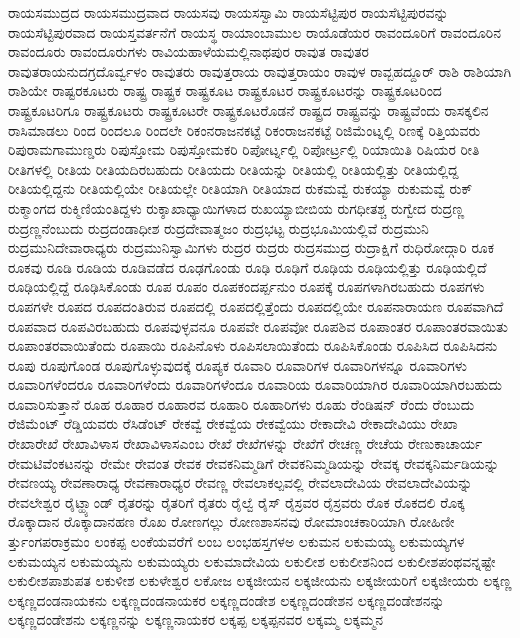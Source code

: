 {ರಾಯಸಮುದ್ರದ
ರಾಯಸಮುದ್ರವಾದ
ರಾಯಸವು
ರಾಯಸಸ್ವಾಮಿ
ರಾಯಸೆಟ್ಟಿಪುರ
ರಾಯಸೆಟ್ಟಿಪುರವನ್ನು
ರಾಯಸೆಟ್ಟಿಪುರವಾದ
ರಾಯಸ್ತವರ್ತನೆಗೆ
ರಾಯಸ್ಥ
ರಾಯಾಂಬಾಮುಲ
ರಾಯೊಡೆಯರ
ರಾವಂದೂರಿಗೆ
ರಾವಂದೂರಿನ
ರಾವಂದೂರು
ರಾವಂದೂರುಗಳು
ರಾವಿಯಹಾಳೆಯಮಲ್ಲಿನಾಥಪುರ
ರಾವುತ
ರಾವುತರ
ರಾವುತರಾಯನುದಗ್ರದೊರ್ವ್ವಳಂ
ರಾವುತರು
ರಾವುತ್ತರಾಯ
ರಾವುತ್ತರಾಯಂ
ರಾವುಳ
ರಾವ್ಬಹದ್ದೂರ್
ರಾಶಿ
ರಾಶಿಯಾಗಿ
ರಾಶಿಯೇ
ರಾಷ್ಟರಕೂಟರು
ರಾಷ್ಟ್ರ
ರಾಷ್ಟ್ರಕ
ರಾಷ್ಟ್ರಕೂಟ
ರಾಷ್ಟ್ರಕೂಟರ
ರಾಷ್ಟ್ರಕೂಟರನ್ನು
ರಾಷ್ಟ್ರಕೂಟರಿಂದ
ರಾಷ್ಟ್ರಕೂಟರಿಗೂ
ರಾಷ್ಟ್ರಕೂಟರು
ರಾಷ್ಟ್ರಕೂಟರೇ
ರಾಷ್ಟ್ರಕೂಟರೊಡನೆ
ರಾಷ್ಟ್ರದ
ರಾಷ್ಟ್ರವನ್ನು
ರಾಷ್ಟ್ರವೆಂದು
ರಾಸಕ್ಕಲಿನ
ರಾಸಿಮಾಡಲು
ರಿಂದ
ರಿಂದಲೂ
ರಿಂದಲೇ
ರಿಕಂನರಾಜನಕಟ್ಟೆ
ರಿಕಂರಾಜನಕಟ್ಟೆ
ರಿಜಿಮೆಂಟ್ನಲ್ಲಿ
ರಿಣಕ್ಕೆ
ರಿತ್ತಿಯವರು
ರಿಪುರಾಮಗಾಮುಣ್ಡರು
ರಿಪುಸ್ತೋಮ
ರಿಪುಸ್ತೋಮಕರಿ
ರಿಪೋರ್ಟ್ನಲ್ಲಿ
ರಿಪೋರ್ಟ್ರಲ್ಲಿ
ರಿಯಾಯಿತಿ
ರಿಷಿಯರ
ರೀತಿ
ರೀತಿಗಳಲ್ಲಿ
ರೀತಿಯ
ರೀತಿಯದಿರಬಹುದು
ರೀತಿಯದು
ರೀತಿಯನ್ನು
ರೀತಿಯಲ್ಲಿ
ರೀತಿಯಲ್ಲಿತ್ತು
ರೀತಿಯಲ್ಲಿದ್ದ
ರೀತಿಯಲ್ಲಿದ್ದನು
ರೀತಿಯಲ್ಲಿಯೇ
ರೀತಿಯಲ್ಲೇ
ರೀತಿಯಾಗಿ
ರೀತಿಯಾದ
ರುಕಮವ್ವೆ
ರುಕಯ್ಯಾ
ರುಕುಮವ್ವೆ
ರುಕ್
ರುಕ್ಮಾಂಗದ
ರುಕ್ಮಿಣಿಯಂತಿದ್ದಳು
ರುಕ್ಶಾಖಾಧ್ಯಾಯಿಗಳಾದ
ರುಖಯ್ಯಾಬೀಬಿಯ
ರುಗಧೀತಶ್ಚ
ರುಗ್ವೇದ
ರುದ್ರಣ್ಣ
ರುದ್ರಣ್ಣನೆಂಬುದು
ರುದ್ರದಂಡಾಧೀಶ
ರುದ್ರದೇವಾತ್ಮಜಂ
ರುದ್ರಭಟ್ಟ
ರುದ್ರಭೂಮಿಯಲ್ಲಿವೆ
ರುದ್ರಮುನಿ
ರುದ್ರಮುನಿದೇವಾರಾಧ್ಯರು
ರುದ್ರಮುನಿಸ್ವಾಮಿಗಳು
ರುದ್ರರ
ರುದ್ರರು
ರುದ್ರಸಮುದ್ರ
ರುದ್ರಾಕ್ಷಿಗೆ
ರುಧಿರೋದ್ಗಾರಿ
ರೂಕ
ರೂಕವು
ರೂಡಿ
ರೂಡಿಯ
ರೂಡಿವಡೆದ
ರೂಢಗೊಂಡು
ರೂಢಿ
ರೂಢಿಗೆ
ರೂಢಿಯ
ರೂಢಿಯಲ್ಲಿತ್ತು
ರೂಢಿಯಲ್ಲಿದೆ
ರೂಢಿಯಲ್ಲಿದ್ದೆ
ರೂಢಿಸಿಕೊಂಡು
ರೂಪ
ರೂಪಂ
ರೂಪಕಂದರ್ಪ್ಪನುಂ
ರೂಪಕ್ಕೆ
ರೂಪಗಳಾಗಿರಬಹುದು
ರೂಪಗಳು
ರೂಪಗಳೇ
ರೂಪದ
ರೂಪದಂತಿರುವ
ರೂಪದಲ್ಲಿ
ರೂಪದಲ್ಲಿತ್ತೆಂದು
ರೂಪದಲ್ಲಿಯೇ
ರೂಪನಾರಾಯಣ
ರೂಪವಾಗಿದೆ
ರೂಪವಾದ
ರೂಪವಿರಬಹುದು
ರೂಪವುಳ್ಳವನೂ
ರೂಪವೇ
ರೂಪವೋ
ರೂಪಶಿವ
ರೂಪಾಂತರ
ರೂಪಾಂತರವಾಯಿತು
ರೂಪಾಂತರವಾಯಿತೆಂದು
ರೂಪಾಯಿ
ರೂಪಿನೊಳು
ರೂಪಿಸಲಾಯಿತೆಂದು
ರೂಪಿಸಿಕೊಂಡು
ರೂಪಿಸಿದ
ರೂಪಿಸಿದನು
ರೂಪು
ರೂಪುಗೊಂಡ
ರೂಪುಗೊಳ್ಳುವುದಕ್ಕೆ
ರೂಪ್ಯಕ
ರೂವಾರಿ
ರೂವಾರಿಗಳ
ರೂವಾರಿಗಳನ್ನೂ
ರೂವಾರಿಗಳು
ರೂವಾರಿಗಳೆಂದರೂ
ರೂವಾರಿಗಳೆಂದು
ರೂವಾರಿಗಳೆಂದೂ
ರೂವಾರಿಯ
ರೂವಾರಿಯಾಗಿರ
ರೂವಾರಿಯಾಗಿರಬಹುದು
ರೂವಾರಿಸುತ್ತಾನೆ
ರೂಹ
ರೂಹಾರ
ರೂಹಾರವ
ರೂಹಾರಿ
ರೂಹಾರಿಗಳು
ರೂಹು
ರೆಂಡಿಷನ್
ರೆಂದು
ರೆಂಬುದು
ರೆಜಿಮೆಂಟ್
ರೆಡ್ಡಿಯವರು
ರೆಸಿಡೆಂಟ್
ರೇಕವ್ವೆ
ರೇಕವ್ವೆಯ
ರೇಕವ್ವೆಯು
ರೇಕಾದೇವಿ
ರೇಕಾದೇವಿಯು
ರೇಖಾ
ರೇಖಾರೇಖೆ
ರೇಖಾವಿಳಾಸ
ರೇಖಾವಿಳಾಸಎಂಬ
ರೇಖೆ
ರೇಖೆಗಳನ್ನು
ರೇಖೆಗೆ
ರೇಚಣ್ಣ
ರೇಚೆಯ
ರೇಣುಕಾಚಾರ್ಯ
ರೇಮಟಿವೆಂಕಟನನ್ನು
ರೇಮೇ
ರೇವಂತ
ರೇವಕ
ರೇವಕನಿಮ್ಮಡಿಗೆ
ರೇವಕನಿಮ್ಮಡಿಯನ್ನು
ರೇವಕ್ಕ
ರೇವಕ್ಕನಿರ್ಮಡಿಯನ್ನು
ರೇವಣಯ್ಯ
ರೇವಣಾರಾಧ್ಯ
ರೇವಣಾರಾಧ್ಯರ
ರೇವಣ್ಣ
ರೇವಲಾಕಲ್ಪವಲ್ಲಿ
ರೇವಲಾದೇವಿಯ
ರೇವಲಾದೇವಿಯನ್ನು
ರೇವಲೇಶ್ವರ
ರೈಟ್ಹ್ಯಾಂಡ್
ರೈತರನ್ನು
ರೈತರಿಗೆ
ರೈತರು
ರೈಲ್ವೆ
ರೈಸ್
ರೈಸ್ರವರ
ರೈಸ್ರವರು
ರೊಕ
ರೊಕದಲಿ
ರೊಕ್ಕ
ರೊಕ್ಕಾದಾನ
ರೊಕ್ಕಾದಾನಹಣ
ರೊಖ
ರೋಣಗಲ್ಲು
ರೋಣಶಾಸನವು
ರೋಮಾಂಚಕಾರಿಯಾಗಿ
ರೋಹಿಣೀ
ರ್ತ್ತುಂಗಪರಾಕ್ರಮಂ
ಲಂಕಪ್ಪ
ಲಂಕೆಯವರೆಗೆ
ಲಂಬ
ಲಂಭಹಸ್ತಗಳಅ
ಲಕುಮನ
ಲಕುಮಯ್ಯ
ಲಕುಮಯ್ಯಗಳ
ಲಕುಮಯ್ಯನ
ಲಕುಮಯ್ಯನು
ಲಕುಮಯ್ಯರು
ಲಕುಮಾದೇವಿಯ
ಲಕುಲೀಶ
ಲಕುಲೀಶನಿಂದ
ಲಕುಲೀಶಪಂಥವನ್ನಷ್ಟೇ
ಲಕುಲೀಶಪಾಶುಪತ
ಲಕುಳೀಶ
ಲಕುಳೇಶ್ವರ
ಲಕೋಜ
ಲಕ್ಕಜೀಯನ
ಲಕ್ಕಜೀಯನು
ಲಕ್ಕಜೀಯರಿಗೆ
ಲಕ್ಕಜೀಯರು
ಲಕ್ಕಣ್ಣ
ಲಕ್ಕಣ್ಣದಂಡನಾಯಕನು
ಲಕ್ಕಣ್ಣದಂಡನಾಯಕರ
ಲಕ್ಕಣ್ಣದಂಡೇಶ
ಲಕ್ಕಣ್ಣದಂಡೇಶನ
ಲಕ್ಕಣ್ಣದಂಡೇಶನನ್ನು
ಲಕ್ಕಣ್ಣದಂಡೇಶನು
ಲಕ್ಕಣ್ಣನನ್ನು
ಲಕ್ಕಣ್ಣನಾಯಕರ
ಲಕ್ಕಪ್ಪ
ಲಕ್ಕಪ್ಪನವರ
ಲಕ್ಕಮ್ಮ
ಲಕ್ಕಮ್ಮನ
}
